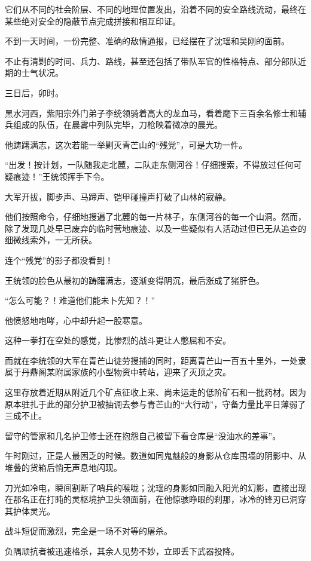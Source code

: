 它们从不同的社会阶层、不同的地理位置发出，沿着不同的安全路线流动，最终在某些绝对安全的隐蔽节点完成拼接和相互印证。

不到一天时间，一份完整、准确的敌情通报，已经摆在了沈瑶和吴刚的面前。

不止有清剿的时间、兵力、路线，甚至还包括了带队军官的性格特点、部分部队近期的士气状况。

\vspace{2em}

三日后，卯时。

黑水河西，紫阳宗外门弟子李统领骑着高大的龙血马，看着麾下三百余名修士和辅兵组成的队伍，在晨雾中列队完毕，刀枪映着微凉的晨光。

他踌躇满志，这次若能一举剿灭青芒山的“残党”，可是大功一件。

“出发！按计划，一队随我走北麓，二队走东侧河谷！仔细搜索，不得放过任何可疑痕迹！”王统领挥手下令。

大军开拔，脚步声、马蹄声、铠甲碰撞声打破了山林的寂静。

他们按照命令，仔细地搜遍了北麓的每一片林子，东侧河谷的每一个山洞。然而，除了发现几处早已废弃的临时营地痕迹、以及一些疑似有人活动过但已无从追查的细微线索外，一无所获。

连个“残党”的影子都没看到！

王统领的脸色从最初的踌躇满志，逐渐变得阴沉，最后涨成了猪肝色。

“怎么可能？！难道他们能未卜先知？！”

他愤怒地咆哮，心中却升起一股寒意。

这种一拳打在空处的感觉，比惨烈的战斗更让人憋屈和不安。

而就在李统领的大军在青芒山徒劳搜捕的同时，距离青芒山一百五十里外，一处隶属于丹鼎阁某附属家族的小型物资中转站，迎来了灭顶之灾。

这里存放着近期从附近几个矿点征收上来、尚未运走的低阶矿石和一批药材。因为原本驻扎于此的部分护卫被抽调去参与青芒山的“大行动”，守备力量比平日薄弱了三成不止。

留守的管家和几名护卫修士还在抱怨自己被留下看仓库是“没油水的差事”。

午时刚过，正是人最困乏的时候。数道如同鬼魅般的身影从仓库围墙的阴影中、从堆叠的货箱后悄无声息地闪现。

刀光如冷电，瞬间割断了哨兵的喉咙；沈瑶的身影如同融入阳光的幻影，直接出现在那名正在打盹的灵枢境护卫头领面前，在他惊骇睁眼的刹那，冰冷的锋刃已洞穿其护体灵光。

战斗短促而激烈，完全是一场不对等的屠杀。

负隅顽抗者被迅速格杀，其余人见势不妙，立即丢下武器投降。

